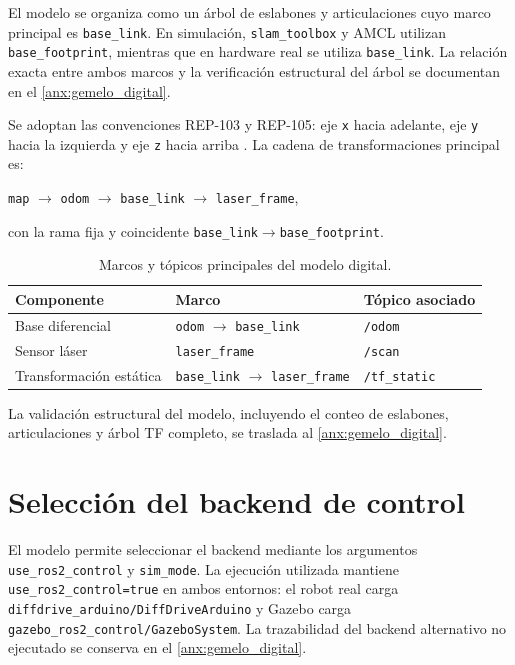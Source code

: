 El modelo se organiza como un árbol de eslabones y articulaciones cuyo marco principal es \texttt{base\_link}. En simulación, \texttt{slam\_toolbox} y AMCL utilizan \texttt{base\_footprint}, mientras que en hardware real se utiliza \texttt{base\_link}. La relación exacta entre ambos marcos y la verificación estructural del árbol se documentan en el \ref{anx:gemelo_digital}.

Se adoptan las convenciones REP-103 y REP-105: eje \texttt{x} hacia adelante, eje \texttt{y} hacia la izquierda y eje \texttt{z} hacia arriba \citep{rep103,rep105}. La cadena de transformaciones principal es:

\begin{center}
\texttt{map} $\rightarrow$ \texttt{odom} $\rightarrow$ \texttt{base\_link} $\rightarrow$ \texttt{laser\_frame},
\end{center}

\noindent con la rama fija y coincidente \texttt{base\_link}$\rightarrow$\texttt{base\_footprint}.

\begin{table}[H]
\centering
\caption{Marcos y tópicos principales del modelo digital.}
\label{tab:topics_frames}
\small
\begin{tabular}{p{3.5cm} p{4.0cm} p{5.0cm}}
\toprule
\textbf{Componente} & \textbf{Marco} & \textbf{Tópico asociado} \\
\midrule
Base diferencial & \texttt{odom} $\rightarrow$ \texttt{base\_link} & \texttt{/odom} \\
Sensor láser & \texttt{laser\_frame} & \texttt{/scan} \\
Transformación estática & \texttt{base\_link} $\rightarrow$ \texttt{laser\_frame} & \texttt{/tf\_static} \\
\bottomrule
\end{tabular}
\end{table}

La validación estructural del modelo, incluyendo el conteo de eslabones, articulaciones y árbol TF completo, se traslada al \ref{anx:gemelo_digital}.

\section{Selección del backend de control}
\label{sec:backend}

El modelo permite seleccionar el backend mediante los argumentos \texttt{use\_ros2\_control} y \texttt{sim\_mode}. La ejecución utilizada mantiene \texttt{use\_ros2\_control=true} en ambos entornos: el robot real carga \texttt{diffdrive\_arduino/DiffDriveArduino} y Gazebo carga \texttt{gazebo\_ros2\_control/GazeboSystem}. La trazabilidad del backend alternativo no ejecutado se conserva en el \ref{anx:gemelo_digital}.


